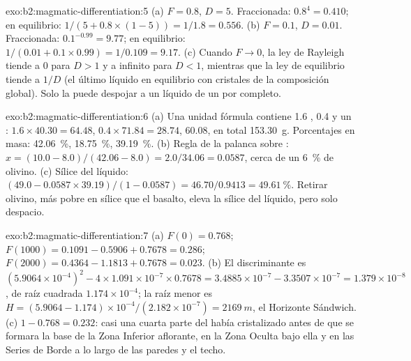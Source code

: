 \begin{solution}{exo:b2:magmatic-differentiation:5}
(a) $F = 0.8$, $D = 5$. Fraccionada: $0.8^{4} = 0.410$; en equilibrio:
$1/(5 + 0.8\times(1 - 5)) = 1/1.8 = 0.556$. (b) $F = 0.1$, $D = 0.01$. Fraccionada:
$0.1^{-0.99} = 9.77$; en equilibrio: $1/(0.01 + 0.1\times0.99) = 1/0.109 = 9.17$.
(c) Cuando $F \to 0$, la ley de Rayleigh tiende a $0$ para $D > 1$ y a infinito para
$D < 1$, mientras que la ley de equilibrio tiende a $1/D$ (el último líquido en equilibrio
con cristales de la composición global). Solo la  puede despojar a un
líquido de un  por completo.
\end{solution}

\begin{solution}{exo:b2:magmatic-differentiation:6}
(a) Una unidad fórmula contiene 1.6 , 0.4  y un : $1.6\times
40.30 = 64.48$, $0.4\times71.84 = 28.74$, 60.08, en total \qty{153.30}{g}. Porcentajes
en masa:  \qty{42.06}{\percent},  \qty{18.75}{\percent},
 \qty{39.19}{\percent}. (b) Regla de la palanca sobre : $x = (10.0 - 8.0)/(42.06
- 8.0) = 2.0/34.06 = 0.0587$, cerca de un \qty{6}{\percent} de olivino. (c) Sílice del
líquido: $(49.0 - 0.0587\times39.19)/(1 - 0.0587) = 46.70/0.9413 =
\qty{49.61}{\percent}$. Retirar olivino, más pobre en sílice que el basalto, eleva la
sílice del líquido, pero solo despacio.
\end{solution}

\begin{solution}{exo:b2:magmatic-differentiation:7}
(a) $F(0) = 0.768$; $F(1000) = 0.1091 - 0.5906 + 0.7678 = 0.286$; $F(2000) = 0.4364
- 1.1813 + 0.7678 = 0.023$. (b) El discriminante es $(5.9064\times10^{-4})^2 -
4\times1.091\times10^{-7}\times0.7678 = 3.4885\times10^{-7} - 3.3507\times10^{-7} =
1.379\times10^{-8}$, de raíz cuadrada $1.174\times10^{-4}$; la raíz menor es
$H = (5.9064 - 1.174)\times10^{-4}/(2.182\times10^{-7}) = \qty{2169}{m}$, el
Horizonte Sándwich. (c) $1 - 0.768 = 0.232$: casi una cuarta parte del  había
cristalizado antes de que se formara la base de la Zona Inferior aflorante, en la Zona Oculta
bajo ella y en las Series de Borde a lo largo de las paredes y el techo.
\end{solution}

